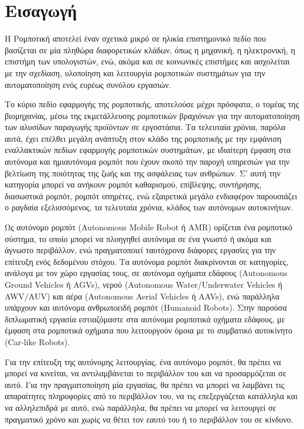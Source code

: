 \chapter{Εισαγωγή} \label{Chapter1}
Η Ρομποτική αποτελεί έναν σχετικά μικρό σε ηλικία επιστημονικό πεδίο που βασίζεται σε μία πληθώρα διαφορετικών κλάδων, όπως η μηχανική, η ηλεκτρονική, η επιστήμη των υπολογιστών, ενώ, ακόμα και σε κοινωνικές επιστήμες και ασχολείται με την σχεδίαση, υλοποίηση και λειτουργία ρομποτικών συστημάτων για την αυτοματοποίηση ενός ευρέως συνόλου εργασιών.

\bigskip
Το κύριο πεδίο εφαρμογής της ρομποτικής, αποτελούσε μέχρι πρόσφατα, ο τομέας της βιομηχανίας, μέσω της εκμετάλλευσης ρομποτικών βραχιόνων για την αυτοματοποίηση των αλυσίδων παραγωγής προϊόντων σε εργοστάσια. Τα τελευταία χρόνια, παρόλα αυτά, έχει επέλθει μεγάλη ανάπτυξη στον κλάδο της ρομποτικής με την εμφάνιση εναλλακτικών πεδίων εφαρμογής ρομποτικών συστημάτων, με ιδιαίτερη έμφαση στα αυτόνομα και ημιαυτόνομα ρομπότ που έχουν σκοπό την παροχή υπηρεσιών για την βελτίωση της ποιότητας της ζωής και της ασφάλειας των ανθρώπων. Σ' αυτή την κατηγορία μπορεί να ανήκουν ρομπότ καθαρισμού, επίβλεψης, συντήρησης, διασωστικά ρομπότ, ρομπότ υπηρέτες, ενώ εξαιρετικά μεγάλο ενδιαφέρον παρουσιάζει ο ραγδαία εξελισσόμενος, τα τελευταία χρόνια, κλάδος των αυτόνομων αυτοκινήτων.

\bigskip
Ως αυτόνομο ρομπότ (Autonomous Mobile Robot ή AMR) ορίζεται ένα ρομποτικό σύστημα, το οποίο μπορεί να πλοηγηθεί αυτόνομα σε ένα γνωστό ή ακόμα και άγνωστο περιβάλλον, ενώ πραγματοποιεί ταυτόχρονα διάφορες εργασίες για την επίτευξη ενός δεδομένου στόχου. Τα αυτόνομα ρομπότ διακρίνονται σε κατηγορίες, ανάλογα με τον χώρο εργασίας τους, σε αυτόνομα οχήματα εδάφους (Autonomous Ground Vehicles ή AGVs), νερού (Autonomous Water/Underwater Vehicles ή AWV/AUV) και αέρα (Autonomous Aerial Vehicles ή AAVs), ενώ παράλληλα υπάρχουν και αυτόνομα ανθρωποειδή ρομπότ (Humanoid Robots). Στην παρούσα διπλωματική εργασία εστιαζόμαστε στα αυτόνομα ρομποτικά οχήματα εδάφους, με έμφαση στα ρομποτικά οχήματα που λειτουργούν όμοια με το συμβατικό αυτοκίνητο (Car-like Robots).

\bigskip
Για την επίτευξη της αυτόνομης λειτουργίας, ένα αυτόνομο ρομπότ, θα πρέπει να μπορεί να κινείται, να αντιλαμβάνεται το περιβάλλον του και να προσαρμόζεται σε αυτό. Για την πραγματοποίηση μία εργασίας, θα πρέπει να μπορεί να λαμβάνει τις απαραίτητες πληροφορίες από το περιβάλλον του, να τις επεξεργάζεται κατάλληλα και να αλληλεπιδρά με αυτό, ενώ παράλληλα, θα πρέπει να μπορεί να λειτουργεί σε πραγματικό χρόνο και χωρίς να θέτει τον εαυτό του ή το περιβάλλον του σε κίνδυνο.

